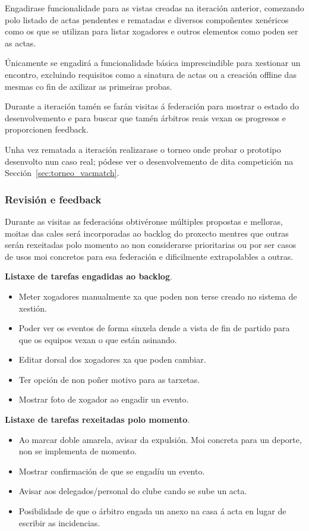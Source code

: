       Engadirase funcionalidade para as vistas creadas na iteración anterior, 
comezando polo listado de actas pendentes e rematadas e diversos compoñentes 
xenéricos como os que se utilizan para listar xogadores e outros elementos como 
poden ser as actas.

      Únicamente se engadirá a funcionalidade básica imprescindible para 
xestionar un encontro, excluindo requisitos como a sinatura de actas ou a 
creación offline das mesmas co fin de axilizar as primeiras probas.

      Durante a iteración tamén se farán visitas á federación para mostrar o 
estado do desenvolvemento e para buscar que tamén árbitros reais vexan os 
progresos e proporcionen feedback.

      Unha vez rematada a iteración realizarase o torneo onde probar o 
prototipo desenvolto nun caso real; pódese ver o desenvolvemento de dita 
competición na Sección~\ref{sec:torneo_vacmatch}.

      \subsubsection{Revisión e feedback}
      Durante as visitas as federacións obtivéronse múltiples propostas e 
melloras, moitas das cales será incorporadas ao backlog do proxecto mentres que 
outras serán rexeitadas polo momento ao non considerarse prioritarias ou por 
ser casos de usos moi concretos para esa federación e dificilmente 
extrapolables a outras.

      \textbf{Listaxe de tarefas engadidas ao backlog}.
        \begin{itemize}
          \item Meter xogadores manualmente xa que poden non terse creado no 
sistema de xestión.
          \item Poder ver os eventos de forma sinxela dende a vista de fin de 
partido para que os equipos vexan o que están asinando.
         \item Editar dorsal dos xogadores xa que poden cambiar.
         \item Ter opción de non poñer motivo para as tarxetas.
         \item Mostrar foto de xogador ao engadir un evento.
        \end{itemize}

      \textbf{Listaxe de tarefas rexeitadas polo momento}.
        \begin{itemize}
         \item Ao marcar doble amarela, avisar da expulsión. Moi concreta para 
un deporte, non se implementa de momento.
         \item Mostrar confirmación de que se engadíu un evento.
         \item Avisar aos delegados/personal do clube cando se sube un acta.
         \item Posibilidade de que o árbitro engada un anexo na casa á acta en 
lugar de escribir as incidencias.
        \end{itemize}

